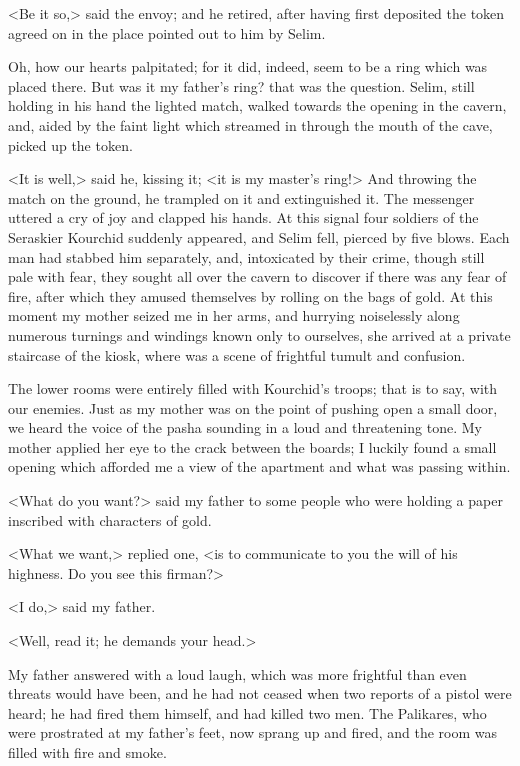 <Be it so,> said the envoy; and he retired, after having first deposited the token agreed on in the place pointed out to him by Selim. 

Oh, how our hearts palpitated; for it did, indeed, seem to be a ring which was placed there. But was it my father's ring? that was the question. Selim, still holding in his hand the lighted match, walked towards the opening in the cavern, and, aided by the faint light which streamed in through the mouth of the cave, picked up the token. 

<It is well,> said he, kissing it; <it is my master's ring!> And throwing the match on the ground, he trampled on it and extinguished it. The messenger uttered a cry of joy and clapped his hands. At this signal four soldiers of the Seraskier Kourchid suddenly appeared, and Selim fell, pierced by five blows. Each man had stabbed him separately, and, intoxicated by their crime, though still pale with fear, they sought all over the cavern to discover if there was any fear of fire, after which they amused themselves by rolling on the bags of gold. At this moment my mother seized me in her arms, and hurrying noiselessly along numerous turnings and windings known only to ourselves, she arrived at a private staircase of the kiosk, where was a scene of frightful tumult and confusion. 

The lower rooms were entirely filled with Kourchid's troops; that is to say, with our enemies. Just as my mother was on the point of pushing open a small door, we heard the voice of the pasha sounding in a loud and threatening tone. My mother applied her eye to the crack between the boards; I luckily found a small opening which afforded me a view of the apartment and what was passing within. 

<What do you want?> said my father to some people who were holding a paper inscribed with characters of gold. 

<What we want,> replied one, <is to communicate to you the will of his highness. Do you see this firman?>

<I do,> said my father. 

<Well, read it; he demands your head.>  

My father answered with a loud laugh, which was more frightful than even threats would have been, and he had not ceased when two reports of a pistol were heard; he had fired them himself, and had killed two men. The Palikares, who were prostrated at my father's feet, now sprang up and fired, and the room was filled with fire and smoke. 

